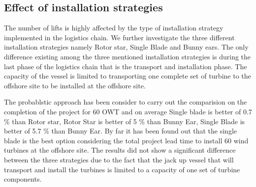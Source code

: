 \subsection{Effect of installation strategies}
The number of lifts is highly affected by the type of installation strategy implemented in the logistics chain. We further investigate the three different installation strategies namely Rotor star, Single Blade and Bunny ears. The only difference existing among the three mentioned installation strategies is during the last phase of the logistics chain that is the transport and installation phase. The capacity of the vessel is limited to transporting one complete set of turbine to the offshore site to be installed at the offshore site.

The probablstic approach has been consider to carry out the comparision on the completion of the project for 60 OWT and on average Single blade is better of 0.7 \% than Rotor star, Rotor Star is better of 5 \% than Bunny Ear, Single Blade is better of 5.7 \% than Bunny Ear. By far it has been found out that the single blade is the best option considering the total project lead time to install 60 wind turbines at the offshore site. The results did not show a significant difference between the three strategies due to the fact that the jack up vessel that will transport and install the turbines is limited to a capacity of one set of turbine components. 